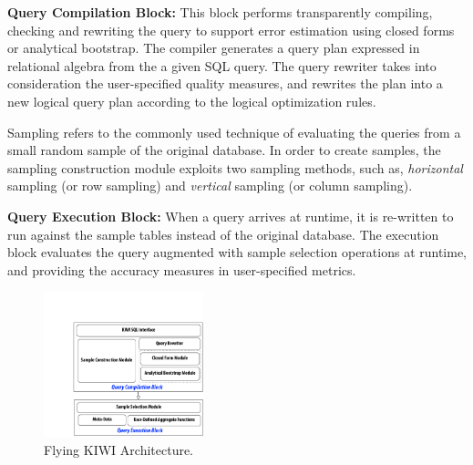 \documentclass{sig-alternate-05-2015}
\begin{document}

\noindent
\textbf{Query Compilation Block:} 
This block performs transparently compiling, checking and rewriting the query to support error estimation using closed forms or analytical bootstrap. The compiler generates a query plan expressed in relational algebra from the a given SQL query. 
The query rewriter takes into consideration the user-specified quality measures, and rewrites the plan into a new logical query plan according to the logical optimization rules. 

Sampling refers to the commonly used technique of evaluating the queries from a small random sample of the original database. In order to create samples, the sampling construction module exploits two sampling methods, such as, \textit{horizontal} sampling (or row sampling) and \textit{vertical} sampling (or column sampling).

\noindent
\textbf{Query Execution Block:} 
When a query arrives at runtime, it is re-written to run against the sample tables instead of the original database.
The execution block evaluates the query augmented with sample selection operations at runtime, 
and providing the accuracy measures in user-specified metrics. 

\begin{figure}[htb]
        \centering
        \includegraphics[width=0.412\textwidth]{sys-architecture.pdf}
        \caption{Flying KIWI Architecture.}
        \label{fig:architecture}
\end{figure}
\end{document}
